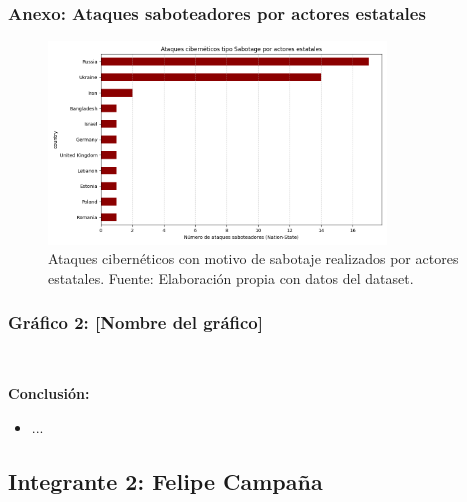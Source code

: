 \documentclass[12pt, a4paper]{article}
\begin{document}
\subsubsection*{Anexo: Ataques saboteadores por actores estatales}
\begin{figure}[H]
    \centering
    \includegraphics[width=0.8\textwidth]{images/sabotage_state.png}
    \caption{Ataques cibernéticos con motivo de sabotaje realizados por actores estatales. Fuente: Elaboración propia con datos del dataset.}
\end{figure}



\subsubsection*{Gráfico 2: [Nombre del gráfico]}
\begin{figure}[H]
    \
\end{figure}

\textbf{Conclusión:}
\begin{itemize}
    \item ...
\end{itemize}

\newpage
\subsection*{Integrante 2: Felipe Campaña}
\end{document}
